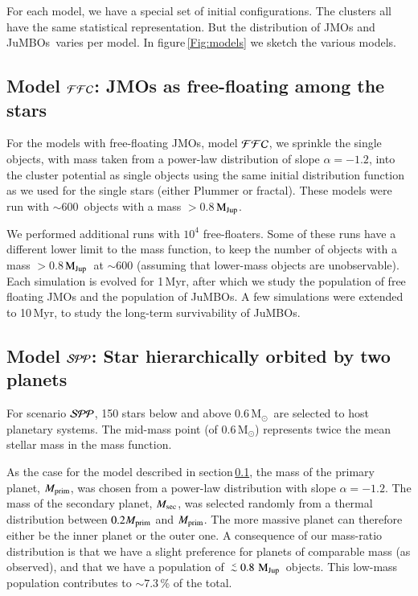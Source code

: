 \documentclass[submission,phys]{lib/SciPost}
\newcommand{\MSun}{\mbox{$\mathrm{{M}}_\odot$}}
\newcommand{\MJup}{\mbox{$\mathrm{{M}}_{\rm Jup}$}}
\def\aplt{\ {\raise-.5ex\hbox{$\buildrel<\over\sim$}}\ }
\newcommand{\jumbos}{\mbox{JuMBOs}}
\begin{document}
For each model, we have a special set of initial configurations. The
clusters all have the same statistical representation. But the
distribution of JMOs and \jumbos\, varies per model.  In
figure\,\ref{Fig:models} we sketch the various models.

\subsection{Model ${\cal FFC}$: JMOs as free-floating among the stars}\label{Sect:FFC}

For the models with free-floating JMOs, model ${\cal FFC}$, 
we sprinkle the single objects, with mass taken from a power-law distribution
of slope $\alpha = -1.2$, into the cluster potential as single
objects using the same initial distribution function as we used for
the single stars (either Plummer or fractal).  These models were run
with $\sim 600$\, objects with a mass $>0.8$\,\MJup. 

We performed additional runs with $10^4$ free-floaters. Some of these
runs have a different lower limit to the mass function, to keep the
number of objects with a mass $>0.8$\,\MJup\, at $\sim 600$ (assuming
that lower-mass objects are unobservable).  Each simulation is evolved
for 1\,Myr, after which we study the population of free floating JMOs
and the population of \jumbos. A few simulations were extended to
10\,Myr, to study the long-term survivability of \jumbos.

\subsection{Model ${\cal SPP}$: Star hierarchically orbited by two planets}

For scenario ${\cal SPP}$, 150 stars below and above 0.6\,\MSun\,
are selected to host planetary systems. The mid-mass point (of 0.6\,$\MSun$) 
represents twice the mean stellar mass in the mass function.

As the case for the model described in section\,\ref{Sect:FFC}, the
mass of the primary planet, $M_{\rm prim}$, was chosen from a
power-law distribution with slope $\alpha=-1.2$. The mass of the
secondary planet, $M_{\rm sec}$, was selected randomly from a thermal
distribution between $0.2 M_{\rm prim}$ and $M_{\rm prim}$.  The more
massive planet can therefore either be the inner planet or the outer
one. A consequence of our mass-ratio distribution is that we have a
slight preference for planets of comparable mass (as observed), and
that we have a population of $\aplt 0.8$\,\MJup\, objects. This
low-mass population contributes to $\sim 7.3$\,\% of the total.
\end{document}
